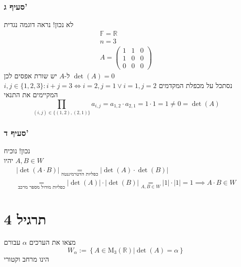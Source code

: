\documentclass[12pt, titlepage]{article}
\begin{document}
\section*{סעיף ג'}
לא נכון! נראה דוגמה נגדית
\begin{gather*}
    \mathbb{F} = \mathbb{R} \\
    n = 3\\
    A = \begin{pmatrix}
        1 & 1 & 0 \\
        1 & 0 & 0 \\
        0 & 0 & 0
    \end{pmatrix}
\end{gather*}
ל-$A$ יש שורת אפסים לכן $\det\left(A\right) = 0$\\
$i,j\in \{1,2,3\}: i+j = 3 \iff i=2,j=1 \lor i=1,j=2$
נסתכל על מכפלת המקדמים המקיימים את התנאי
\[
    \prod_{\left(i,j\right)\in\{\left(1,2\right),\left(2,1\right)\}} a_{i,j} = a_{1,2} \cdot a_{2,1} = 1 \cdot 1 = 1 \neq 0 = \det\left(A\right)
    \]
\section*{סעיף ד'}
נכון! נוכיח\\
יהיו $A,B \in W$
\begin{gather*}
  \left| \det\left(A\cdot B\right) \right| \underset{\text{כפליות הדטרמיננטה}}{=} \left| \det\left(A\right) \cdot \det\left(B\right) \right|\\
  \underset{\text{כפליות מודול מספר מרכב}}{=} \left|\det\left(A\right)\right| \cdot \left|\det\left(B\right)\right| \underset{A,B\in W}{=} \left|1\right| \cdot \left|1\right| = 1 \implies A\cdot B \in W
\end{gather*}
\blacksquare
\newpage
\part*{תרגיל 4}
מצאו את הערכים $\alpha$ עבורם
\[
    W_{\alpha} := \left\{A\in\mathrm{M}_3\left(\mathbb{R}\right)|\det\left(A\right)=\alpha\right\}
\]
הינו מרחב וקטורי
\end{document}
